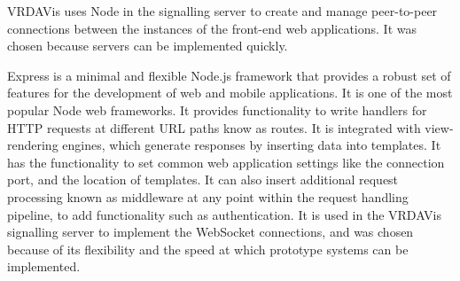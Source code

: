 VRDAVis uses Node in the signalling server to create and manage peer-to-peer connections between the instances of the front-end web applications.
It was chosen because servers can be implemented quickly.

Express is a minimal and flexible Node.js framework that provides a robust set of features for the development of web and mobile applications.
It is one of the most popular Node web frameworks.
It provides functionality to write handlers for HTTP requests at different URL paths know as routes.
It is integrated with view-rendering engines, which generate responses by inserting data into templates.
It has the functionality to set common web application settings like the connection port, and the location of templates.
It can also insert additional request processing known as middleware at any point within the request handling pipeline, to add functionality such as authentication.
It is used in the VRDAVis signalling server to implement the WebSocket connections, and was chosen because of its flexibility and the speed at which prototype systems can be implemented.

